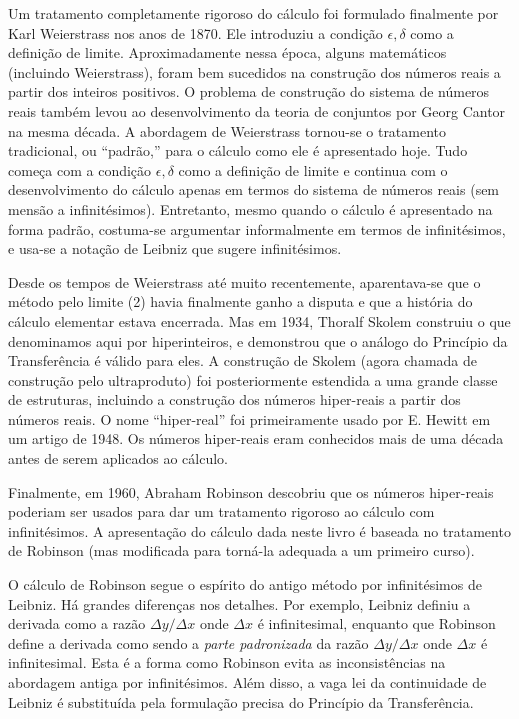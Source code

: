 \documentclass{svmono}
\begin{document}
Um tratamento completamente rigoroso do cálculo foi formulado finalmente
por Karl Weierstrass nos anos de 1870. Ele introduziu a condição
$\epsilon,\delta$ como a definição de limite. Aproximadamente nessa
época, alguns matemáticos (incluindo Weierstrass), foram bem sucedidos
na construção dos números reais a partir dos inteiros positivos. O
problema de construção do sistema de números reais também levou ao
desenvolvimento da teoria de conjuntos por Georg Cantor na mesma
década. A abordagem de Weierstrass tornou-se o tratamento tradicional,
ou ``padrão,'' para o cálculo como ele é apresentado hoje. Tudo começa
com a condição $\epsilon,\delta$ como a definição de limite e continua
com o desenvolvimento do cálculo apenas em termos do sistema de
números reais (sem mensão a infinitésimos). Entretanto, mesmo quando
o cálculo é apresentado na forma padrão, costuma-se argumentar
informalmente em termos de infinitésimos, e usa-se a notação de
Leibniz que sugere infinitésimos.

Desde os tempos de Weierstrass até muito recentemente, aparentava-se
que o método pelo limite (2) havia finalmente ganho a disputa e
que a história do cálculo elementar estava encerrada. Mas em 1934,
Thoralf Skolem construiu o que denominamos aqui por hiperinteiros,
e demonstrou que o análogo do Princípio da Transferência é válido para
eles. A construção de Skolem (agora chamada de construção pelo
ultraproduto) foi posteriormente estendida a uma grande classe de
estruturas, incluindo a construção dos números hiper-reais a partir
dos números reais. O nome ``hiper-real'' foi primeiramente usado por
E. Hewitt em um artigo de 1948. Os números hiper-reais eram conhecidos
mais de uma década antes de serem aplicados ao cálculo.

Finalmente, em 1960, Abraham Robinson descobriu que os números hiper-reais
poderiam ser usados para dar um tratamento rigoroso ao cálculo com
infinitésimos. A apresentação do cálculo dada neste livro é baseada
no tratamento de Robinson (mas modificada para torná-la adequada a um
primeiro curso).

O cálculo de Robinson segue o espírito do antigo método por infinitésimos
de Leibniz. Há grandes diferenças nos detalhes. Por exemplo, Leibniz
definiu a derivada como a razão $\Delta y / \Delta x$ onde $\Delta x$
é infinitesimal, enquanto que Robinson define a derivada como sendo
a \emph{parte padronizada} da razão $\Delta y / \Delta x$ onde $\Delta x$
é infinitesimal. Esta é a forma como Robinson evita as inconsistências
na abordagem antiga por infinitésimos. Além disso, a vaga lei da
continuidade de Leibniz é substituída pela formulação precisa do
Princípio da Transferência.
\end{document}
